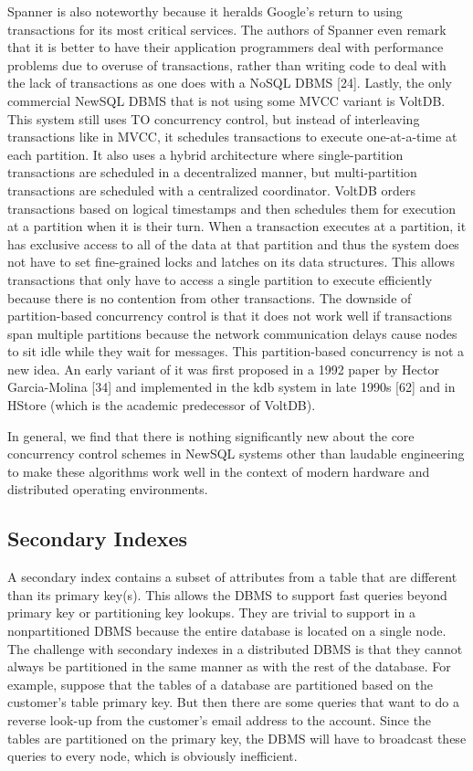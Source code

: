 \documentclass[a4paper,12pt,notitlepage,twoside,openright]{article}
\begin{document}
Spanner is also noteworthy because it heralds Google's return to using
transactions for its most critical services. The authors of Spanner even
remark that it is better to have their application programmers deal with
performance problems due to overuse of transactions, rather than writing
code to deal with the lack of transactions as one does with a NoSQL DBMS
{[}24{]}. Lastly, the only commercial NewSQL DBMS that is not using some
MVCC variant is VoltDB. This system still uses TO concurrency control,
but instead of interleaving transactions like in MVCC, it schedules
transactions to execute one-at-a-time at each partition. It also uses a
hybrid architecture where single-partition transactions are scheduled in
a decentralized manner, but multi-partition transactions are scheduled
with a centralized coordinator. VoltDB orders transactions based on
logical timestamps and then schedules them for execution at a partition
when it is their turn. When a transaction executes at a partition, it
has exclusive access to all of the data at that partition and thus the
system does not have to set fine-grained locks and latches on its data
structures. This allows transactions that only have to access a single
partition to execute efficiently because there is no contention from
other transactions. The downside of partition-based concurrency control
is that it does not work well if transactions span multiple partitions
because the network communication delays cause nodes to sit idle while
they wait for messages. This partition-based concurrency is not a new
idea. An early variant of it was first proposed in a 1992 paper by
Hector Garcia-Molina {[}34{]} and implemented in the kdb system in late
1990s {[}62{]} and in HStore (which is the academic predecessor of
VoltDB).

In general, we find that there is nothing significantly new about the
core concurrency control schemes in NewSQL systems other than laudable
engineering to make these algorithms work well in the context of modern
hardware and distributed operating environments.

\hypertarget{secondary-indexes}{%
\subsection{Secondary Indexes}\label{secondary-indexes}}

A secondary index contains a subset of attributes from a table that are
different than its primary key(s). This allows the DBMS to support fast
queries beyond primary key or partitioning key lookups. They are trivial
to support in a nonpartitioned DBMS because the entire database is
located on a single node. The challenge with secondary indexes in a
distributed DBMS is that they cannot always be partitioned in the same
manner as with the rest of the database. For example, suppose that the
tables of a database are partitioned based on the customer's table
primary key. But then there are some queries that want to do a reverse
look-up from the customer's email address to the account. Since the
tables are partitioned on the primary key, the DBMS will have to
broadcast these queries to every node, which is obviously inefficient.
\end{document}
